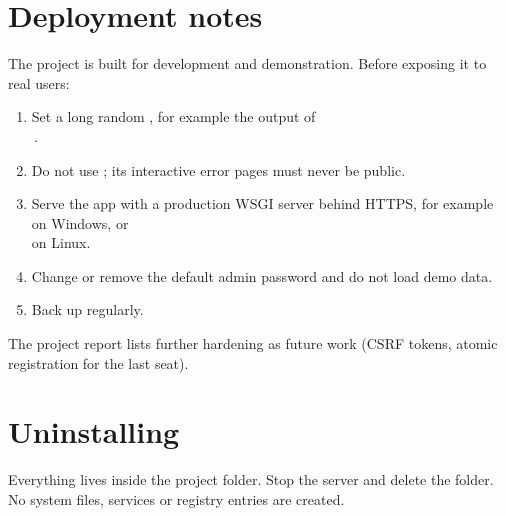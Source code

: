 \documentclass[11pt,a4paper]{article}
\begin{document}
\section{Deployment notes}

The project is built for development and demonstration. Before exposing it to real users:

\begin{enumerate}
  \item Set a long random , for example the output of\\
        \,.
  \item Do not use ; its interactive error pages must never be public.
  \item Serve the app with a production WSGI server behind HTTPS, for example\\
         on Windows, or\\
         on Linux.
  \item Change or remove the default admin password and do not load demo data.
  \item Back up  regularly.
\end{enumerate}

The project report lists further hardening as future work (CSRF tokens, atomic registration for the
last seat).

\section{Uninstalling}

Everything lives inside the project folder. Stop the server and delete the folder. No system files,
services or registry entries are created.
\end{document}

